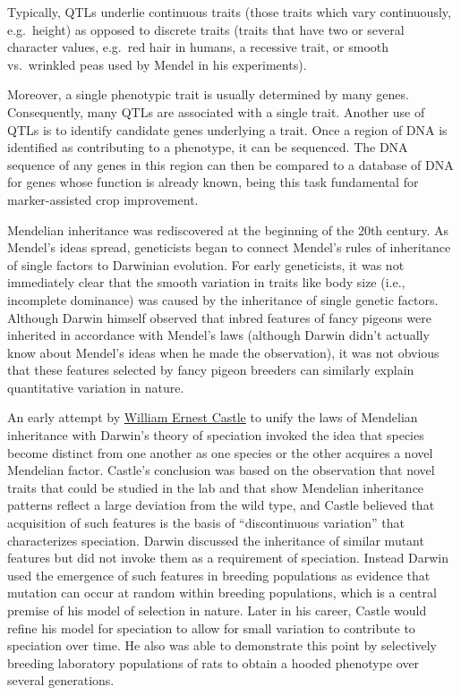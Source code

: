 Typically, QTLs underlie continuous traits (those traits which vary continuously, e.g.~height) as opposed to discrete traits (traits that have two or several character values, e.g.~red hair in humans, a recessive trait, or smooth vs.~wrinkled peas used by Mendel in his experiments).

Moreover, a single phenotypic trait is usually determined by many genes. Consequently, many QTLs are associated with a single trait. Another use of QTLs is to identify candidate genes underlying a trait. Once a region of DNA is identified as contributing to a phenotype, it can be sequenced. The DNA sequence of any genes in this region can then be compared to a database of DNA for genes whose function is already known, being this task fundamental for marker-assisted crop improvement.

Mendelian inheritance was rediscovered at the beginning of the 20th century. As Mendel's ideas spread, geneticists began to connect Mendel's rules of inheritance of single factors to Darwinian evolution. For early geneticists, it was not immediately clear that the smooth variation in traits like body size (i.e., incomplete dominance) was caused by the inheritance of single genetic factors. Although Darwin himself observed that inbred features of fancy pigeons were inherited in accordance with Mendel's laws (although Darwin didn't actually know about Mendel's ideas when he made the observation), it was not obvious that these features selected by fancy pigeon breeders can similarly explain quantitative variation in nature.

An early attempt by \href{https://en.wikipedia.org/wiki/William_E._Castle}{William Ernest Castle} to unify the laws of Mendelian inheritance with Darwin's theory of speciation invoked the idea that species become distinct from one another as one species or the other acquires a novel Mendelian factor. Castle's conclusion was based on the observation that novel traits that could be studied in the lab and that show Mendelian inheritance patterns reflect a large deviation from the wild type, and Castle believed that acquisition of such features is the basis of ``discontinuous variation'' that characterizes speciation. Darwin discussed the inheritance of similar mutant features but did not invoke them as a requirement of speciation. Instead Darwin used the emergence of such features in breeding populations as evidence that mutation can occur at random within breeding populations, which is a central premise of his model of selection in nature. Later in his career, Castle would refine his model for speciation to allow for small variation to contribute to speciation over time. He also was able to demonstrate this point by selectively breeding laboratory populations of rats to obtain a hooded phenotype over several generations.

